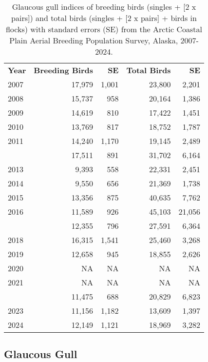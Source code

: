 \documentclass[
]{article}
\begin{document}
\begin{longtable}[t]{lrrrr}

\caption{\label{tbl-GLGU}Glaucous gull indices of breeding birds
(singles + {[}2 x pairs{]}) and total birds (singles + {[}2 x pairs{]} +
birds in flocks) with standard errors (SE) from the Arctic Coastal Plain
Aerial Breeding Population Survey, Alaska, 2007-2024.}

\tabularnewline

\\
\toprule
\textbf{Year} & \textbf{Breeding Birds} & \textbf{SE} & \textbf{Total Birds} & \textbf{SE}\\
\midrule
2007 & 17,979 & 1,001 & 23,800 & 2,201\\
2008 & 15,737 & 958 & 20,164 & 1,386\\
2009 & 14,619 & 810 & 17,422 & 1,451\\
2010 & 13,769 & 817 & 18,752 & 1,787\\
2011 & 14,240 & 1,170 & 19,145 & 2,489\\
\addlinespace
2012 & 17,511 & 891 & 31,702 & 6,164\\
2013 & 9,393 & 558 & 22,331 & 2,451\\
2014 & 9,550 & 656 & 21,369 & 1,738\\
2015 & 13,356 & 875 & 40,635 & 7,762\\
2016 & 11,589 & 926 & 45,103 & 21,056\\
\addlinespace
2017 & 12,355 & 796 & 27,591 & 6,364\\
2018 & 16,315 & 1,541 & 25,460 & 3,268\\
2019 & 12,658 & 945 & 18,855 & 2,626\\
2020 & NA & NA & NA & NA\\
2021 & NA & NA & NA & NA\\
\addlinespace
2022 & 11,475 & 688 & 20,829 & 6,823\\
2023 & 11,156 & 1,182 & 13,609 & 1,397\\
2024 & 12,149 & 1,121 & 18,969 & 3,282\\
\bottomrule

\end{longtable}

\endgroup{}

\newpage{}

\subsection*{Glaucous Gull}\label{glaucous-gull-2}
\end{document}
